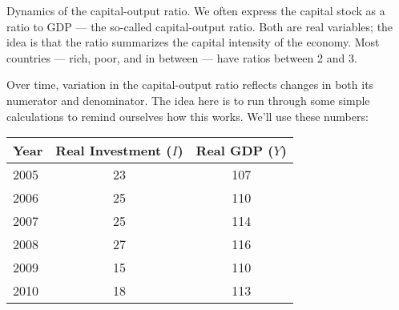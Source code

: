 \documentclass[12pt]{exam}
\begin{document}
\begin{questions}
\begin{solution}
\end{solution}


\question Dynamics of the capital-output ratio.
We often express the capital stock as a ratio to GDP ---
the so-called capital-output ratio.
Both are real variables;
the idea is that the ratio summarizes the capital intensity
of the economy.
Most countries --- rich, poor, and in between ---
have ratios between 2 and 3.

Over time, variation in the capital-output ratio reflects changes
in both its numerator and denominator.
The idea here is to run through some simple calculations
to remind ourselves how this works.
We'll use these numbers:

\begin{center}
\begin{tabular}{lcc}
\toprule
Year \phantom{xxxxx}   & Real Investment ($I$)  &  Real GDP ($Y$) \\
\midrule
2005    &  23  &  107 \\
2006    &  25  &  110 \\
2007    &  25  &  114 \\
2008    &  27  &  116 \\
2009    &  15  &  110 \\
2010    &  18  &  113 \\
\bottomrule
\end{tabular}
\end{center}
%


\end{questions}
\end{document}
